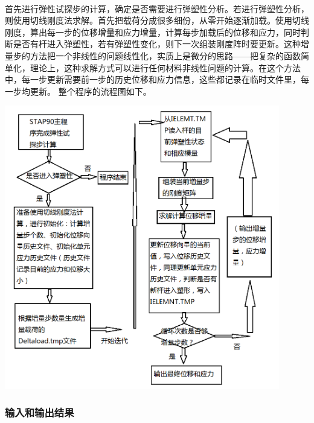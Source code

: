 \documentclass[UTF8]{ctexbook}
\begin{document}
\paragraph{}
首先进行弹性试探步的计算，确定是否需要进行弹塑性分析。若进行弹塑性分析，则使用切线刚度法求解。首先把载荷分成很多细份，从零开始逐渐加载。使用切线刚度，算出每一步的位移增量和应力增量，计算每步加载后的位移和应力，同时判断是否有杆进入弹塑性，若有弹塑性变化，则下一次组装刚度阵时要更新。这种增量步的方法把一个非线性的问题线性化，实质上是微分的思路——把复杂的函数简单化，理论上，这种求解方式可以进行任何材料非线性问题的计算。在这个方法中，每一步更新需要前一步的历史位移和应力信息，这些都记录在临时文件里，每一步均更新。
整个程序的流程图如下。
\begin{center}
\includegraphics[width=0.9\textwidth]{plastic3.png}
\end{center}
\subsubsection{输入和输出结果}
\end{document}
